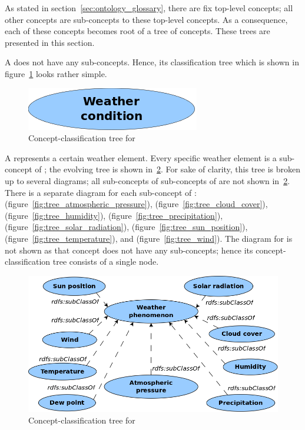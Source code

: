As stated in section~\ref{sec:ontology_glossary}, there are fix top-level concepts; all other concepts are sub-concepts to these top-level concepts. As a consequence, each of these concepts becomes root of a tree of concepts. These trees are presented in this section.

A  does not have any sub-concepts. Hence, its classification tree which is shown in figure~\ref{fig:tree_weather_condition} looks rather simple.

\begin{figure}
  \centering
  \includegraphics[width=.3\textwidth]{figures/diagrams/weather-condition.png}
  \caption{Concept-classification tree for }
  \label{fig:tree_weather_condition}
\end{figure}

A  represents a certain weather element. Every specific weather element is a sub-concept of ; the evolving tree is shown in~\ref{fig:tree_weather_phenomenon}. For sake of clarity, this tree is broken up to several diagrams; all sub-concepts of sub-concepts of  are not shown in~\ref{fig:tree_weather_phenomenon}. There is a separate diagram for each sub-concept of :  (figure~\ref{fig:tree_atmospheric_pressure}),  (figure~\ref{fig:tree_cloud_cover}),  (figure~\ref{fig:tree_humidity}),  (figure~\ref{fig:tree_precipitation}),  (figure~\ref{fig:tree_solar_radiation}),  (figure~\ref{fig:tree_sun_position}),  (figure~\ref{fig:tree_temperature}), and  (figure~\ref{fig:tree_wind}). The diagram for  is not shown as that concept does not have any sub-concepts; hence its concept-classification tree consists of a single node.

\begin{figure}
  \centering
  \includegraphics[width=.8\textwidth]{figures/diagrams/weather-phenomenon.png}
  \caption{Concept-classification tree for }
  \label{fig:tree_weather_phenomenon}
\end{figure}

